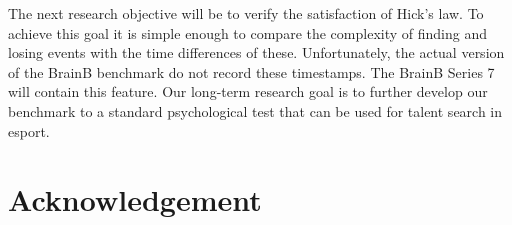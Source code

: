 \documentclass[a4paper]{article}
\begin{document}
The next research objective will be to verify the satisfaction of Hick's law. 
To achieve this goal it is simple enough to compare the complexity of finding and losing events with the time differences 
of these. Unfortunately, the actual version of the BrainB benchmark do not record these timestamps. 
The BrainB Series 7 will contain this feature. Our long-term research goal is to further develop our benchmark to a standard psychological test that can be used for talent search in esport.

\section{Acknowledgement}




%

\end{document}
